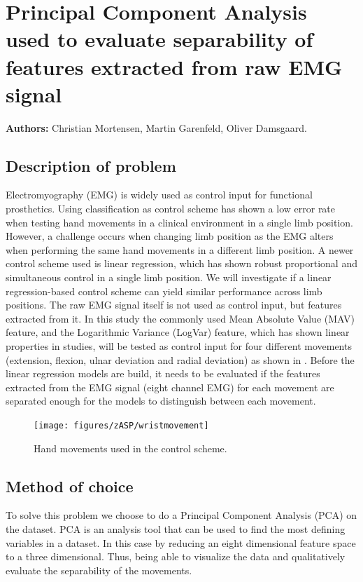

\chapter*{Principal Component Analysis used to evaluate separability of features extracted from raw EMG signal}

\textbf{Authors:} Christian Mortensen, Martin Garenfeld, Oliver Damsgaard.

\section*{Description of problem}
Electromyography (EMG) is widely used as control input for functional prosthetics. Using classification as control scheme has shown a low error rate when testing hand movements in a clinical environment in a single limb position. However, a challenge occurs when changing limb position as the EMG alters when performing the same hand movements in a different limb position. A newer control scheme used is linear regression, which has shown robust proportional and simultaneous control in a single limb position. We will investigate if a linear regression-based control scheme can yield similar performance across limb positions. 
The raw EMG signal itself is not used as control input, but features extracted from it. In this study the commonly used Mean Absolute Value (MAV) feature, and the Logarithmic Variance (LogVar) feature, which has shown linear properties in studies, will be tested as control input for four different movements (extension, flexion, ulnar deviation and radial deviation) as shown in . Before the linear regression models are build, it needs to be evaluated if the features extracted from the EMG signal (eight channel EMG) for each movement are separated enough for the models to distinguish between each movement. 

\begin{figure}[H] 
	\texttt{[image: figures/zASP/wristmovement]}
	\caption{Hand movements used in the control scheme.}
	\label{gestures}
\end{figure}

\section*{Method of choice}
To solve this problem we choose to do a Principal Component Analysis (PCA) on the dataset. PCA is an analysis tool that can be used to find the most defining variables in a dataset. In this case by reducing an eight dimensional feature space to a three dimensional. Thus, being able to visualize the data and qualitatively evaluate the separability of the movements.

